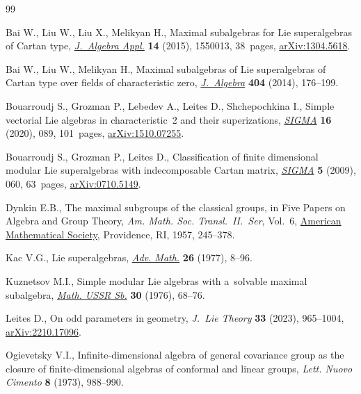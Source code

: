 \documentclass[pdftex]{sigma}
\newcommand {\<} [2] {{\left.\vphantom{#2}\right.^{#1\!}\!{#2}}}
\numberwithin{equation}{section}
\begin{document}
\begin{thebibliography}{99}
\footnotesize\itemsep=0pt

Bai W., Liu W., Liu X., Melikyan H., Maximal subalgebras for {L}ie
 superalgebras of {C}artan type,
 \href{https://doi.org/10.1142/S0219498815500139}{\textit{J.~Algebra Appl.}}
 \textbf{14} (2015), 1550013, 38~pages,
 \href{http://arxiv.org/abs/1304.5618}{arXiv:1304.5618}.

Bai W., Liu W., Melikyan H., Maximal subalgebras of {L}ie superalgebras of
 {C}artan type over fields of characteristic zero,
 \href{https://doi.org/10.1016/j.jalgebra.2013.12.033}{\textit{J.~Algebra}}
 \textbf{404} (2014), 176--199.

Bouarroudj S., Grozman P., Lebedev A., Leites D., Shchepochkina I., Simple
 vectorial {L}ie algebras in characteristic~2 and their superizations,
 \href{https://doi.org/10.3842/SIGMA.2020.089}{\textit{SIGMA}} \textbf{16}
 (2020), 089, 101~pages,
 \href{http://arxiv.org/abs/1510.07255}{arXiv:1510.07255}.

Bouarroudj S., Grozman P., Leites D., Classification of finite dimensional
 modular {L}ie superalgebras with indecomposable {C}artan matrix,
 \href{https://doi.org/10.3842/SIGMA.2009.060}{\textit{SIGMA}} \textbf{5}
 (2009), 060, 63~pages,
 \href{http://arxiv.org/abs/0710.5149}{arXiv:0710.5149}.

Dynkin E.B., The maximal subgroups of the classical groups, in Five Papers on
 Algebra and Group Theory, \textit{Am. Math. Soc. Transl.~II.~Ser}, Vol.~6,
 \href{https://doi.org/10.1090/trans2/006}{American Mathematical Society},
 Providence, RI, 1957, 245--378.

Kac V.G., Lie superalgebras,
 \href{https://doi.org/10.1016/0001-8708(77)90017-2}{\textit{Adv. Math.}}
 \textbf{26} (1977), 8--96.

Kuznetsov M.I., Simple modular {L}ie algebras with a~solvable maximal
 subalgebra,
 \href{https://doi.org/10.1070/SM1976v030n01ABEH001899}{\textit{Math. USSR
 Sb.}} \textbf{30} (1976), 68--76.

Leites D., On odd parameters in geometry, \textit{J.~Lie Theory} \textbf{33}
 (2023), 965--1004, \href{http://arxiv.org/abs/2210.17096}{arXiv:2210.17096}.

Ogievetsky V.I., Infinite-dimensional algebra of general covariance group as
 the closure of finite-dimensional algebras of conformal and linear groups,
 \textit{Lett. Nuovo Cimento} \textbf{8} (1973), 988--990.


\end{thebibliography}
\end{document}
